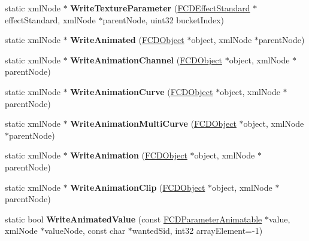 \begin{DoxyCompactItemize}
\item 
\hypertarget{classFArchiveXML_a2d69a87ce64757bc1a4e37ba3ff01354}{
static xmlNode $\ast$ {\bfseries WriteTextureParameter} (\hyperlink{classFCDEffectStandard}{FCDEffectStandard} $\ast$effectStandard, xmlNode $\ast$parentNode, uint32 bucketIndex)}
\label{classFArchiveXML_a2d69a87ce64757bc1a4e37ba3ff01354}

\item 
\hypertarget{classFArchiveXML_a930d5526059c9dcf0a352546d9b0bcd2}{
static xmlNode $\ast$ {\bfseries WriteAnimated} (\hyperlink{classFCDObject}{FCDObject} $\ast$object, xmlNode $\ast$parentNode)}
\label{classFArchiveXML_a930d5526059c9dcf0a352546d9b0bcd2}

\item 
\hypertarget{classFArchiveXML_a00eb2534a16d63608d3d5fbc1ac404b6}{
static xmlNode $\ast$ {\bfseries WriteAnimationChannel} (\hyperlink{classFCDObject}{FCDObject} $\ast$object, xmlNode $\ast$parentNode)}
\label{classFArchiveXML_a00eb2534a16d63608d3d5fbc1ac404b6}

\item 
\hypertarget{classFArchiveXML_a49da485e530c6945ef1294686a205a4c}{
static xmlNode $\ast$ {\bfseries WriteAnimationCurve} (\hyperlink{classFCDObject}{FCDObject} $\ast$object, xmlNode $\ast$parentNode)}
\label{classFArchiveXML_a49da485e530c6945ef1294686a205a4c}

\item 
\hypertarget{classFArchiveXML_a0161f4f73928164672f0a7a04c770790}{
static xmlNode $\ast$ {\bfseries WriteAnimationMultiCurve} (\hyperlink{classFCDObject}{FCDObject} $\ast$object, xmlNode $\ast$parentNode)}
\label{classFArchiveXML_a0161f4f73928164672f0a7a04c770790}

\item 
\hypertarget{classFArchiveXML_ad25b81e2dfcf019623b24c371508ce7f}{
static xmlNode $\ast$ {\bfseries WriteAnimation} (\hyperlink{classFCDObject}{FCDObject} $\ast$object, xmlNode $\ast$parentNode)}
\label{classFArchiveXML_ad25b81e2dfcf019623b24c371508ce7f}

\item 
\hypertarget{classFArchiveXML_ad1cb7b03cf613abedcffd3aea4c1ab89}{
static xmlNode $\ast$ {\bfseries WriteAnimationClip} (\hyperlink{classFCDObject}{FCDObject} $\ast$object, xmlNode $\ast$parentNode)}
\label{classFArchiveXML_ad1cb7b03cf613abedcffd3aea4c1ab89}

\item 
\hypertarget{classFArchiveXML_ab423b0ecc02eac4b4564b2237ec90472}{
static bool {\bfseries WriteAnimatedValue} (const \hyperlink{classFCDParameterAnimatable}{FCDParameterAnimatable} $\ast$value, xmlNode $\ast$valueNode, const char $\ast$wantedSid, int32 arrayElement=-\/1)}
\label{classFArchiveXML_ab423b0ecc02eac4b4564b2237ec90472}


\end{DoxyCompactItemize}
